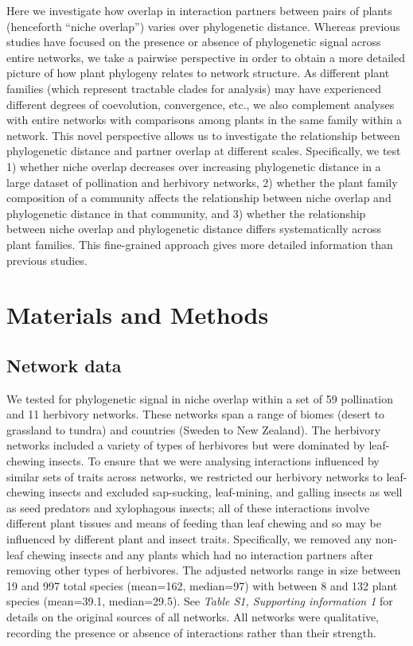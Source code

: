 \documentclass[12pt]{article}
\begin{document}
\begin{spacing}{1.5}
  Here we investigate how overlap in interaction partners between 
  pairs of plants (henceforth ``niche overlap'') varies over 
  phylogenetic distance. 
  Whereas previous 
  studies have focused on the presence or absence of phylogenetic
  signal across entire networks, we take a pairwise perspective in
  order to obtain a more detailed picture of how plant phylogeny
  relates to network structure. As different plant families (which represent tractable clades for analysis) may have experienced different degrees of coevolution, convergence, etc., we also complement analyses with entire networks with comparisons among plants in the same family within a network. 
  This novel perspective allows us to investigate the relationship between phylogenetic distance and partner overlap at different scales. 
  Specifically,
  we test 1) whether niche overlap decreases over increasing phylogenetic
  distance in a large dataset of pollination and herbivory networks, 
  2) whether the plant family composition of a community affects the
  relationship between niche overlap and phylogenetic distance in that 
  community, and 3) whether the relationship between niche overlap and 
  phylogenetic distance differs systematically across plant families. 
  This fine-grained approach gives more detailed information than previous studies. 

\clearpage

\section*{Materials and Methods}

  \subsection*{Network data}

    We tested for phylogenetic signal in niche overlap within a 
    set of 59 pollination and 11 herbivory networks. These networks span 
    a range of biomes (desert to grassland to tundra) and 
    countries (Sweden to New Zealand). The herbivory networks included a 
    variety of types of herbivores but were dominated by leaf-chewing insects. To ensure that we were analysing interactions 
    influenced by similar sets of traits across networks, we restricted 
    our herbivory networks to leaf-chewing insects and excluded 
    sap-sucking, leaf-mining, and galling insects as well as seed 
    predators and xylophagous insects; all of these interactions involve 
    different plant tissues and means of feeding than leaf chewing 
    and so may be influenced by different plant and insect traits. 
    Specifically, we removed any non-leaf chewing insects and any 
    plants which had no interaction partners after removing other types  
    of herbivores. The adjusted networks range in size between 19 and 
    997 total species (mean=162, median=97) with between 8 and 132 
    plant species (mean=39.1, median=29.5). See \emph{Table S1, 
    Supporting information 1} for details on the original sources of all 
    networks. All networks were qualitative, recording the presence or 
    absence of interactions rather than their strength.



\end{spacing}
\end{document}

